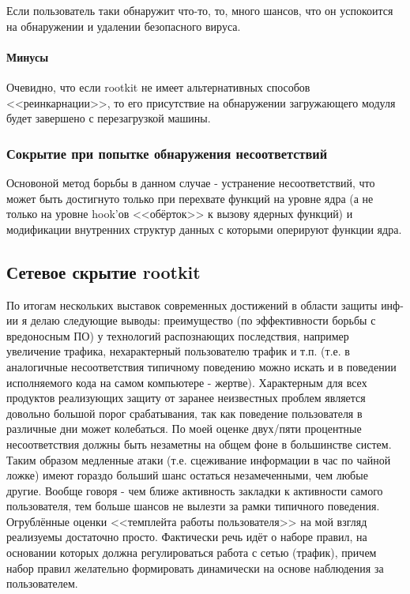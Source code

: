 Если пользователь таки обнаружит что-то, то, много шансов, что он
успокоится на обнаружении и удалении безопасного вируса.

\paragraph{Минусы\\}

Очевидно, что если rootkit не имеет альтернативных способов
<<реинкарнации>>, то его присутствие на обнаружении загружающего модуля
будет завершено с  перезагрузкой машины.

\subsubsection{Сокрытие при попытке обнаружения несоответствий}

Основоной метод борьбы в данном случае - устранение несоответствий, что
может быть достигнуто только при перехвате функций на уровне ядра (а не
только на уровне hook'ов <<обёрток>> к вызову ядерных функций) и модификации
внутренних структур данных с которыми оперируют функции ядра.


\subsection{Сетевое скрытие rootkit}

По итогам нескольких выставок современных достижений в области защиты
инф-ии я делаю следующие выводы:  преимущество (по эффективности борьбы
с вредоносным ПО) у технологий распознающих последствия, например
увеличение трафика, нехарактерный пользователю трафик и т.п. (т.е. в
аналогичные  несоответствия типичному поведению можно искать и в
поведении исполняемого кода на самом компьютере - жертве). Характерным
для всех продуктов реализующих защиту от заранее неизвестных проблем
является довольно большой порог срабатывания, так как поведение
пользователя в различные дни может колебаться. По моей оценке двух/пяти
процентные несоответствия должны быть незаметны на общем фоне в
большинстве систем. Таким образом медленные атаки (т.е. сцеживание
информации в час по чайной ложке) имеют гораздо больший шанс остаться
незамеченными, чем любые другие. Вообще говоря - чем  ближе активность
закладки к активности самого пользователя, тем больше шансов не вылезти
за рамки типичного поведения. Огрублённые оценки <<темплейта работы
пользователя>> на мой взгляд реализуемы достаточно просто. Фактически
речь идёт о наборе правил, на основании которых должна регулироваться
работа с сетью (трафик), причем набор  правил желательно формировать динамически
на основе наблюдения за пользователем.

